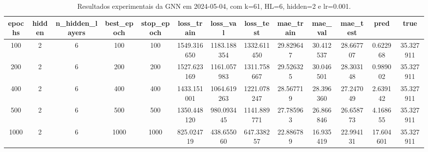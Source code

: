 \begin{table}[h]
\centering
\caption{Resultados experimentais da GNN em 2024-05-04, com k=61, HL=6, hidden=2 e lr=0.001.}
\label{tab:gnn_results_k61_hl6_h2_d20240504}
\begin{tabular}{ccccccccccccc}
\toprule
epochs & hidden & n\_hidden\_layers & best\_epoch & stop\_epoch & loss\_train & loss\_val & loss\_test & mae\_train & mae\_val & mae\_test & pred & true \\
\midrule
100 & 2 & 6 & 100 & 100 & 1549.316650 & 1183.188354 & 1332.611450 & 29.829647 & 30.412537 & 28.667707 & 0.622968 & 35.327911 \\
200 & 2 & 6 & 200 & 200 & 1527.623169 & 1161.057983 & 1311.758667 & 29.526325 & 30.046501 & 28.303148 & 0.989002 & 35.327911 \\
400 & 2 & 6 & 400 & 400 & 1433.151001 & 1064.619263 & 1221.078247 & 28.567719 & 28.396360 & 27.247049 & 2.639142 & 35.327911 \\
500 & 2 & 6 & 500 & 500 & 1350.448120 & 980.093445 & 1141.889771 & 27.785963 & 26.866846 & 26.658773 & 4.168655 & 35.327911 \\
1000 & 2 & 6 & 1000 & 1000 & 825.024719 & 438.655060 & 647.338257 & 22.886789 & 16.935419 & 22.994131 & 17.604601 & 35.327911 \\
\bottomrule
\end{tabular}
\end{table}
